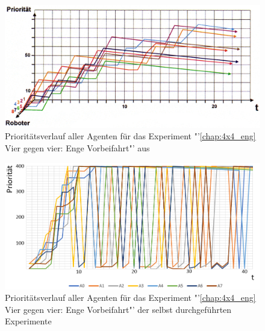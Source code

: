 \begin{figure}[H]
    \includegraphics[width=\textwidth]{images/4vs4_tight_prio_ref.png}
    \centering
    \caption{Prioritätsverlauf aller Agenten für das Experiment "'\ref{chap:4x4_eng} Vier gegen vier: Enge Vorbeifahrt"' aus \cite{book:regele}}
    \label{fig:4x4_prio_1}
\end{figure}

\begin{figure}[H]
    \includegraphics[width=\textwidth]{images/4vs4_tight_prio.png}
    \centering
    \caption{Prioritätsverlauf aller Agenten für das Experiment "'\ref{chap:4x4_eng} Vier gegen vier: Enge Vorbeifahrt"' der selbst durchgeführten Experimente}
    \label{fig:4x4_prio_2}
\end{figure}